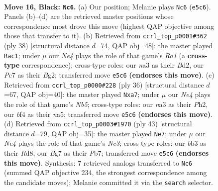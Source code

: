 \documentclass[11pt]{article}
\begin{document}
\clearpage

\begin{figure}[p]\centering
\begin{subfigure}{0.46\textwidth}\centering
\resizebox{\linewidth}{!}{%
\newchessgame
\chessboard[
  setfen={2kr2r1/1pp1ppbp/1n4p1/p3n3/5B1P/NB3P2/PPP1KP2/R5R1 b - - 1 16},
  showmover=false,
  pgfstyle=straightmove, color=movearrow, markmove={e5-c6}
]}
\caption{}
\end{subfigure}\hfill
\begin{subfigure}{0.46\textwidth}\centering
\resizebox{\linewidth}{!}{%
\newchessgame
\chessboard[
  setfen={r2r2k1/1p1b1ppp/1pp5/2bn4/8/P4NPP/1P1BPPB1/R4RK1 w - - 2 20},
  showmover=false,
  pgfstyle=straightmove, color=movearrow, markmove={a1-c1}
]}
\caption{}
\end{subfigure}
\\[4pt]
\begin{subfigure}{0.46\textwidth}\centering
\resizebox{\linewidth}{!}{%
\newchessgame
\chessboard[
  setfen={2rr2k1/pp2bpp1/7p/nNPp1b2/8/4PN2/P3BPPP/2RR2K1 w - - 8 19},
  showmover=false,
  pgfstyle=straightmove, color=movearrow, markmove={b5-a7}
]}
\caption{}
\end{subfigure}\hfill
\begin{subfigure}{0.46\textwidth}\centering
\resizebox{\linewidth}{!}{%
\newchessgame
\chessboard[
  setfen={2rr2k1/ppb2pp1/2n1pn1p/1B6/6P1/P1N2P2/1PPB2P1/2KR3R b - - 4 22},
  showmover=false,
  pgfstyle=straightmove, color=movearrow, markmove={c6-e7}
]}
\caption{}
\end{subfigure}
\caption{\textbf{Move 16, Black: \texttt{Nc6}.} (a) Our position; Melanie plays \texttt{Nc6} (\texttt{e5c6}). Panels (b)--(d) are the retrieved master positions whose correspondence most drove this move (highest QAP objective among those that transfer to it). (b) Retrieved from \texttt{ccrl\_top\_p0001\#362} (ply 38) [structural distance $d$=74, QAP obj=48]: the master played \texttt{Rac1}; under $\mu$ our \emph{Ne4} plays the role of that game's \emph{Ra1} (a \textbf{cross-type} correspondence); cross-type roles: our \emph{n}a3 as their \emph{B}d2, our \emph{P}c7 as their \emph{B}g2; transferred move \texttt{e5c6} \textbf{(endorses this move)}. (c) Retrieved from \texttt{ccrl\_top\_p0000\#228} (ply 36) [structural distance $d$=67, QAP obj=40]: the master played \texttt{Nxa7}; under $\mu$ our \emph{Ne4} plays the role of that game's \emph{Nb5}; cross-type roles: our \emph{n}a3 as their \emph{P}h2, our \emph{b}f4 as their \emph{n}a5; transferred move \texttt{e5c6} \textbf{(endorses this move)}. (d) Retrieved from \texttt{ccrl\_top\_p0003\#1970} (ply 43) [structural distance $d$=79, QAP obj=35]: the master played \texttt{Ne7}; under $\mu$ our \emph{Ne4} plays the role of that game's \emph{Nc3}; cross-type roles: our \emph{b}b3 as their \emph{R}d8, our \emph{B}g7 as their \emph{P}b7; transferred move \texttt{e5c6} \textbf{(endorses this move)}. Synthesis: 7 retrieved analogs transferred to \texttt{Nc6} (summed QAP objective 234, the strongest correspondence among the candidate moves); Melanie committed it via the \texttt{search} selector.}
\label{fig:thought-m31}
\end{figure}
\end{document}
